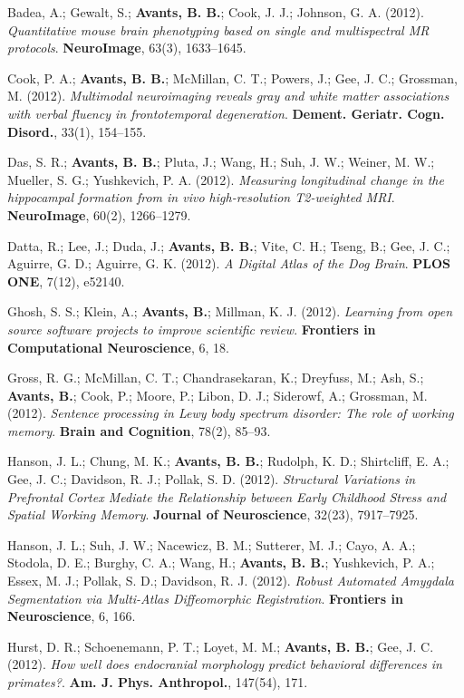 \documentclass[10pt,letterpaper]{article}
\begin{document}
\begin{enumerate}
{  %
  \item Badea, A.; Gewalt, S.; \textbf{Avants, B. B.}; Cook, J. J.; Johnson, G. A. (2012). \textit{Quantitative mouse brain phenotyping based on single and multispectral MR protocols}. \textbf{NeuroImage}, 63(3), 1633--1645.
  \item Cook, P. A.; \textbf{Avants, B. B.}; McMillan, C. T.; Powers, J.; Gee, J. C.; Grossman, M. (2012). \textit{Multimodal neuroimaging reveals gray and white matter associations with verbal fluency in frontotemporal degeneration}. \textbf{Dement. Geriatr. Cogn. Disord.}, 33(1), 154--155.
  \item Das, S. R.; \textbf{Avants, B. B.}; Pluta, J.; Wang, H.; Suh, J. W.; Weiner, M. W.; Mueller, S. G.; Yushkevich, P. A. (2012). \textit{Measuring longitudinal change in the hippocampal formation from in vivo high-resolution T2-weighted MRI}. \textbf{NeuroImage}, 60(2), 1266--1279.
  \item Datta, R.; Lee, J.; Duda, J.; \textbf{Avants, B. B.}; Vite, C. H.; Tseng, B.; Gee, J. C.; Aguirre, G. D.; Aguirre, G. K. (2012). \textit{A Digital Atlas of the Dog Brain}. \textbf{PLOS ONE}, 7(12), e52140.
  \item Ghosh, S. S.; Klein, A.; \textbf{Avants, B.}; Millman, K. J. (2012). \textit{Learning from open source software projects to improve scientific review}. \textbf{Frontiers in Computational Neuroscience}, 6, 18.
  \item Gross, R. G.; McMillan, C. T.; Chandrasekaran, K.; Dreyfuss, M.; Ash, S.; \textbf{Avants, B.}; Cook, P.; Moore, P.; Libon, D. J.; Siderowf, A.; Grossman, M. (2012). \textit{Sentence processing in Lewy body spectrum disorder: The role of working memory}. \textbf{Brain and Cognition}, 78(2), 85--93.
  \item Hanson, J. L.; Chung, M. K.; \textbf{Avants, B. B.}; Rudolph, K. D.; Shirtcliff, E. A.; Gee, J. C.; Davidson, R. J.; Pollak, S. D. (2012). \textit{Structural Variations in Prefrontal Cortex Mediate the Relationship between Early Childhood Stress and Spatial Working Memory}. \textbf{Journal of Neuroscience}, 32(23), 7917--7925.
  \item Hanson, J. L.; Suh, J. W.; Nacewicz, B. M.; Sutterer, M. J.; Cayo, A. A.; Stodola, D. E.; Burghy, C. A.; Wang, H.; \textbf{Avants, B. B.}; Yushkevich, P. A.; Essex, M. J.; Pollak, S. D.; Davidson, R. J. (2012). \textit{Robust Automated Amygdala Segmentation via Multi-Atlas Diffeomorphic Registration}. \textbf{Frontiers in Neuroscience}, 6, 166.
  \item Hurst, D. R.; Schoenemann, P. T.; Loyet, M. M.; \textbf{Avants, B. B.}; Gee, J. C. (2012). \textit{How well does endocranial morphology predict behavioral differences in primates?}. \textbf{Am. J. Phys. Anthropol.}, 147(54), 171.
}
\end{enumerate}
\end{document}
